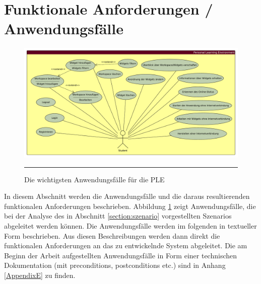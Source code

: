 \section{Funktionale Anforderungen / Anwendungsfälle}\label{section:anwendungsfaelle}
\begin{figure}[htb]
  \centering
  \includegraphics[width=\textwidth,height=\textheight,keepaspectratio]{./Figures/anwendungsfaelle_quer.pdf}
    \rule{35em}{0.5pt}
  \caption[Anwendungsfälle der PLE]{Die wichtigsten Anwendungsfälle für die PLE}
  \label{fig:anwendungsfaelle}
\end{figure}

In diesem Abschnitt werden die Anwendungsfälle und die daraus resultierenden funktionalen Anforderungen beschrieben. Abbildung \ref{fig:anwendungsfaelle} zeigt Anwendungsfälle, die bei der Analyse des in Abschnitt \ref{section:szenario} vorgestellten Szenarios abgeleitet werden können. Die Anwendungsfälle werden im folgenden in textueller Form beschrieben. Aus diesen Beschreibungen werden dann direkt die funktionalen Anforderungen an das zu entwickelnde System abgeleitet. Die am Beginn der Arbeit aufgestellten Anwendungsfälle in Form einer technischen Dokumentation (mit preconditions, postconditions etc.) sind in Anhang \ref{AppendixE} zu finden.

